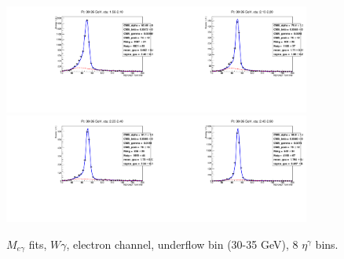 \begin{figure}[htb]
\begin{center}
   \includegraphics[width=0.45\textwidth]{../figs/figs_v11/ELECTRON_WGamma/EtoGammaFits/sa_hZmass_h_Data_EtoGamma_Enr_ENDCAP_pt30to35_ieta0_noWMtCut.pdf}\includegraphics[width=0.45\textwidth]{../figs/figs_v11/ELECTRON_WGamma/EtoGammaFits/sa_hZmass_h_Data_EtoGamma_Enr_ENDCAP_pt30to35_ieta1_noWMtCut.pdf}\\
   \includegraphics[width=0.45\textwidth]{../figs/figs_v11/ELECTRON_WGamma/EtoGammaFits/sa_hZmass_h_Data_EtoGamma_Enr_ENDCAP_pt30to35_ieta2_noWMtCut.pdf}\includegraphics[width=0.45\textwidth]{../figs/figs_v11/ELECTRON_WGamma/EtoGammaFits/sa_hZmass_h_Data_EtoGamma_Enr_ENDCAP_pt30to35_ieta3_noWMtCut.pdf}\\
  \label{fig:etogFits_30to35}
  \caption{$M_{e\gamma}$ fits, $W\gamma$, electron channel, underflow bin (30-35 GeV), 8 $\eta^{\gamma}$ bins.}
  \end{center}
\end{figure}

